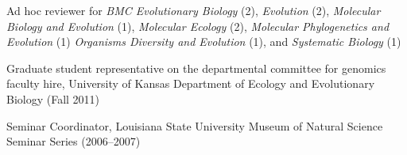 \begin{myItemize}
\item Ad hoc reviewer for
    \emph{BMC Evolutionary Biology} (2),
    \emph{Evolution} (2),
    \emph{Molecular Biology and Evolution} (1),
    \emph{Molecular Ecology} (2),
    \emph{Molecular Phylogenetics and Evolution} (1)
    \emph{Organisms Diversity and Evolution} (1), and
    \emph{Systematic Biology} (1)
\item Graduate student representative on the departmental committee for
    genomics faculty hire, University of Kansas Department of Ecology and
    Evolutionary Biology (Fall 2011)
\item Seminar Coordinator, Louisiana State University Museum of Natural Science
    Seminar Series (2006--2007)
\end{myItemize}

